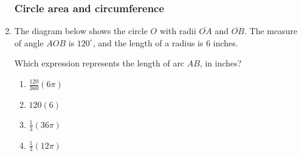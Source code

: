 \documentclass[12pt, twoside]{article}
\begin{document}
\begin{enumerate}
    \subsubsection*{Circle area and circumference}
      \item The diagram below shows the circle $O$ with radii $\overline{OA}$ and $\overline{OB}$. The measure of angle $AOB$ is $120^\circ$, and the length of a radius is 6 inches.
      \begin{center}
      \end{center}
      Which expression represents the length of arc $AB$, in inches?
      \begin{multicols}{2}
        \begin{enumerate}
          \item $\displaystyle \frac{120}{360}(6\pi)$
          \item $120(6)$
          \item $\displaystyle \frac{1}{3}(36\pi)$
          \item $\displaystyle \frac{1}{3}(12\pi)$
        \end{enumerate}
    \end{multicols}

  \end{enumerate}
\end{document}
